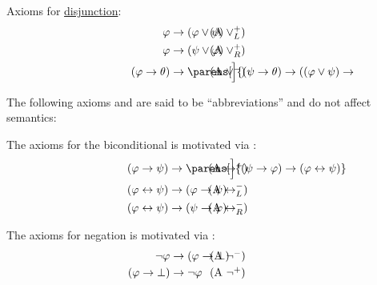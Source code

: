 \begin{definition}
\begin{thmenum}[series=def:minimal_propositional_derivation_system]
     Axioms for \hyperref[def:propositional_language/connectives/disjunction]{disjunction}:
    \begin{align}
      \mathllap{ \varphi }                    &\rightarrow \mathrlap{ (\varphi \vee \psi) } \tag{\textrm{A} \( \vee_L^+ \)} \label{eq:def:minimal_propositional_derivation_system/or/intro_left} \\
      \mathllap{ \varphi }                    &\rightarrow \mathrlap{ (\psi \vee \varphi) } \tag{\textrm{A} \( \vee_R^+ \)} \label{eq:def:minimal_propositional_derivation_system/or/intro_right} \\
      \mathllap{ (\varphi \rightarrow \theta) } &\rightarrow \mathrlap{ \parens[\Big]{ (\psi \rightarrow \theta) \rightarrow ((\varphi \vee \psi) \rightarrow \theta) } } \tag{\textrm{A} \( \vee^- \)} \label{eq:def:minimal_propositional_derivation_system/or/elim}
    \end{align}
  \end{thmenum}

  The following axioms and are said to be \enquote{abbreviations} and do not affect semantics:
  \begin{thmenum}[resume=def:minimal_propositional_derivation_system]
     The axioms for the biconditional is motivated via :
    \begin{align}
      \mathllap{ (\varphi \rightarrow \psi)     } &\rightarrow \mathrlap{ \parens[\Big]{ (\psi \rightarrow \varphi) \rightarrow (\varphi \leftrightarrow \psi) } } \tag{\textrm{A} \( \leftrightarrow^+ \)} \label{def:minimal_propositional_derivation_system/iff/intro} \\
      \mathllap{ (\varphi \leftrightarrow \psi)  }&\rightarrow \mathrlap{ (\varphi \rightarrow \psi) } \tag{\textrm{A} \( \leftrightarrow_L^- \)} \label{eq:def:minimal_propositional_derivation_system/iff/elim_left} \\
      \mathllap{ (\varphi \leftrightarrow \psi) } &\rightarrow \mathrlap{ (\psi \rightarrow \varphi) } \tag{\textrm{A} \( \leftrightarrow_R^- \)} \label{eq:def:minimal_propositional_derivation_system/iff/elim_right}
    \end{align}

     The axioms for negation is motivated via :
    \begin{align}
      \mathllap{ \neg \varphi }               &\rightarrow \mathrlap{ (\varphi \rightarrow \bot) } \tag{\textrm{A} \( \neg^- \)} \label{eq:def:minimal_propositional_derivation_system/neg/elim} \\
      \mathllap{ (\varphi \rightarrow \bot) } &\rightarrow \mathrlap{ \neg \varphi } \tag{\textrm{A} \( \neg^+ \)} \label{eq:def:minimal_propositional_derivation_system/neg/intro}
    \end{align}
  \end{thmenum}
\end{definition}

